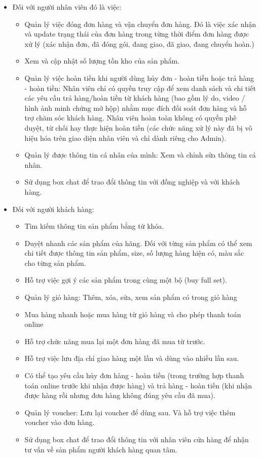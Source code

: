 \begin{itemize}
  \item Đối với người nhân viên đó là việc:
        \begin{itemize}
          \item Quản lý việc đóng đơn hàng và vận chuyển đơn hàng. Đó là việc xác nhận và update trạng thái của đơn hàng trong từng thời điểm đơn hàng được xử lý (xác nhận đơn, đã đóng gói, đang giao, đã giao, đang chuyển hoàn.)
          \item Xem và cập nhật số lượng tồn kho của sản phẩm.
          \item Quản lý việc hoàn tiền khi người dùng hủy đơn - hoàn tiền hoặc trả hàng - hoàn tiền: Nhân viên chỉ có quyền truy cập để xem danh sách và chi tiết các yêu cầu trả hàng/hoàn tiền từ khách hàng (bao gồm lý do, video / hình ảnh minh chứng mở hộp) nhằm mục đích đối soát đơn hàng và hỗ trợ chăm sóc khách hàng. Nhân viên hoàn toàn không có quyền phê duyệt, từ chối hay thực hiện hoàn tiền (các chức năng xử lý này đã bị vô hiệu hóa trên giao diện nhân viên và chỉ dành riêng cho Admin).
          \item Quản lý được thông tin cá nhân của mình: Xem và chỉnh sửa thông tin cá nhân.
          \item Sử dụng box chat để trao đổi thông tin với đồng nghiệp và với khách hàng.
        \end{itemize}

  \item Đối với người khách hàng:
        \begin{itemize}
          \item Tìm kiếm thông tin sản phẩm bằng từ khóa.
          \item Duyệt nhanh các sản phẩm của hãng. Đối với từng sản phẩm có thể xem chi tiết được thông tin sản phẩm, size, số lượng hàng hiện có, màu sắc cho từng sản phẩm.
          \item Hỗ trợ việc gợi ý các sản phẩm trong cùng một bộ (buy full set).
          \item Quản lý giỏ hàng: Thêm, xóa, sửa, xem sản phẩm có trong giỏ hàng
          \item Mua hàng nhanh hoặc mua hàng từ giỏ hàng và cho phép thanh toán online
          \item Hỗ trợ chức năng mua lại một đơn hàng đã mua từ trước.
          \item Hỗ trợ việc lưu địa chỉ giao hàng một lần và dùng vào nhiều lần sau.
          \item Có thể tạo yêu cầu hủy đơn hàng - hoàn tiền (trong trường hợp thanh toán online trước khi nhận được hàng) và trả hàng - hoàn tiền (khi nhận được hàng rồi nhưng đơn hàng không đúng yêu cầu đã mua).
          \item Quản lý voucher: Lưu lại voucher để dùng sau. Và hỗ trợ việc thêm voucher vào đơn hàng.
          \item Sử dụng box chat để trao đổi thông tin với nhân viên cửa hàng để nhận tư vấn về sản phẩm người khách hàng quan tâm.
        \end{itemize}
\end{itemize}

